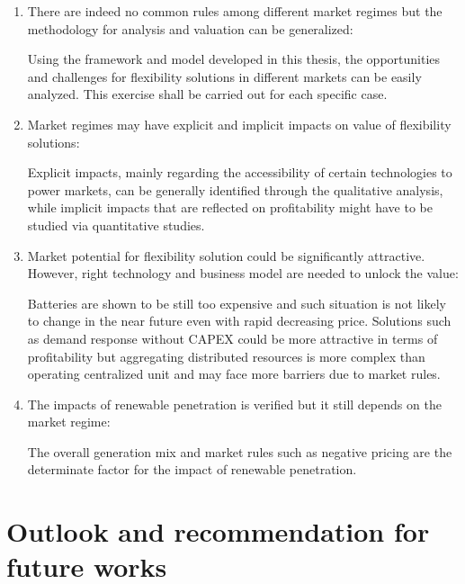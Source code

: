 \begin{enumerate}
	\item There are indeed no common rules among different market regimes but the methodology for analysis and valuation can be generalized:
	
	Using the framework and model developed in this thesis, the opportunities and challenges for flexibility solutions in different markets can be easily analyzed. This exercise shall be carried out for each specific case.
	
	\item Market regimes may have explicit and implicit impacts on value of flexibility solutions:
	
	Explicit impacts, mainly regarding the accessibility of certain technologies to power markets, can be generally identified through the qualitative analysis, while implicit impacts that are reflected on profitability might have to be studied via quantitative studies.
	
	\item Market potential for flexibility solution could be significantly attractive. However, right technology and business model are needed to unlock the value:
	
	Batteries are shown to be still too expensive and such situation is not likely to change in the near future even with rapid decreasing price. Solutions such as demand response without CAPEX could be more attractive in terms of profitability but aggregating distributed resources is more complex than operating centralized unit and may face more barriers due to market rules.
	
	\item The impacts of renewable penetration is verified but it still depends on the market regime:
	
	The overall generation mix and market rules such as negative pricing are the determinate factor for the impact of renewable penetration.
	
	
\end{enumerate} 

\section{Outlook and recommendation for future works}

